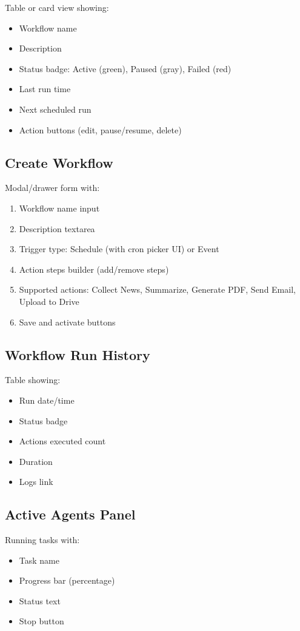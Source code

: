 \documentclass{report}
\begin{document}
Table or card view showing:
\begin{itemize}
    \item Workflow name
    \item Description
    \item Status badge: Active (green), Paused (gray), Failed (red)
    \item Last run time
    \item Next scheduled run
    \item Action buttons (edit, pause/resume, delete)
\end{itemize}

\subsection{Create Workflow}

Modal/drawer form with:
\begin{enumerate}
    \item Workflow name input
    \item Description textarea
    \item Trigger type: Schedule (with cron picker UI) or Event
    \item Action steps builder (add/remove steps)
    \item Supported actions: Collect News, Summarize, Generate PDF, Send Email, Upload to Drive
    \item Save and activate buttons
\end{enumerate}

\subsection{Workflow Run History}

Table showing:
\begin{itemize}
    \item Run date/time
    \item Status badge
    \item Actions executed count
    \item Duration
    \item Logs link
\end{itemize}

\subsection{Active Agents Panel}

Running tasks with:
\begin{itemize}
    \item Task name
    \item Progress bar (percentage)
    \item Status text
    \item Stop button
\end{itemize}
\end{document}
